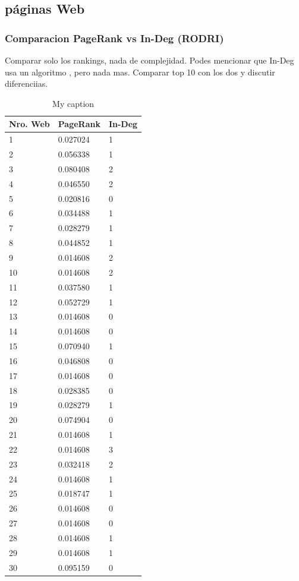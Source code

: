 \subsection{páginas Web}

\subsubsection{Comparacion PageRank vs In-Deg (RODRI)}
Comparar solo los rankings, nada de complejidad. Podes mencionar que In-Deg usa un algoritmo , pero nada mas. Comparar top 10 con los dos y discutir diferenciias.

\begin{table}[]
\centering
\caption{My caption}
\label{my-label}
\begin{tabular}{lll}
\hline
Nro. Web & PageRank & In-Deg \\ \hline
1        & 0.027024 & 1      \\
2        & 0.056338 & 1      \\
3        & 0.080408 & 2      \\
4        & 0.046550 & 2      \\
5        & 0.020816 & 0      \\
6        & 0.034488 & 1      \\
7        & 0.028279 & 1      \\
8        & 0.044852 & 1      \\
9        & 0.014608 & 2      \\
10       & 0.014608 & 2      \\
11       & 0.037580 & 1      \\
12       & 0.052729 & 1      \\
13       & 0.014608 & 0      \\
14       & 0.014608 & 0      \\
15       & 0.070940 & 1      \\
16       & 0.046808 & 0      \\
17       & 0.014608 & 0      \\
18       & 0.028385 & 0      \\
19       & 0.028279 & 1      \\
20       & 0.074904 & 0      \\
21       & 0.014608 & 1      \\
22       & 0.014608 & 3      \\
23       & 0.032418 & 2      \\
24       & 0.014608 & 1      \\
25       & 0.018747 & 1      \\
26       & 0.014608 & 0      \\
27       & 0.014608 & 0      \\
28       & 0.014608 & 1      \\
29       & 0.014608 & 1      \\
30       & 0.095159 & 0      \\ \hline
\end{tabular}
\end{table}

